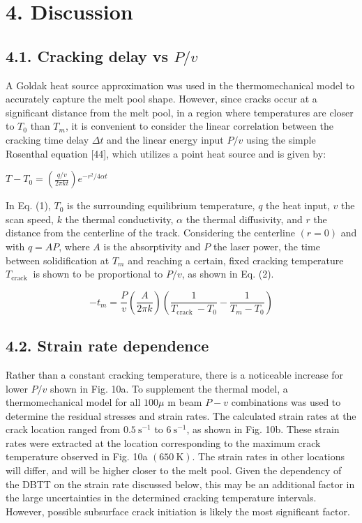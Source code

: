 \documentclass[10pt]{article}
\begin{document}
\section*{4. Discussion}
\subsection*{4.1. Cracking delay vs $P / v$}
A Goldak heat source approximation was used in the thermomechanical model to accurately capture the melt pool shape. However, since cracks occur at a significant distance from the melt pool, in a region where temperatures are closer to $T_{0}$ than $T_{m}$, it is convenient to consider the linear correlation between the cracking time delay $\Delta t$ and the linear energy input $P / v$ using the simple Rosenthal equation [44], which utilizes a point heat source and is given by:

$T-T_{0}=\left(\frac{q / v}{2 \pi k t}\right) e^{-r^{2} / 4 \alpha t}$

In Eq. (1), $T_{0}$ is the surrounding equilibrium temperature, $q$ the heat input, $v$ the scan speed, $k$ the thermal conductivity, $\alpha$ the thermal diffusivity, and $r$ the distance from the centerline of the track. Considering the centerline $(r=0)$ and with $q=A P$, where $A$ is the absorptivity and $P$ the laser power, the time between solidification at $T_{m}$ and reaching a certain, fixed cracking temperature $T_{\text {crack }}$ is shown to be proportional to $P / v$, as shown in Eq. (2).


\begin{equation*}
-t_{m}=\frac{P}{v}\left(\frac{A}{2 \pi k}\right)\left(\frac{1}{T_{\text {crack }}-T_{0}}-\frac{1}{T_{m}-T_{0}}\right) \tag{2}
\end{equation*}


\subsection*{4.2. Strain rate dependence}
Rather than a constant cracking temperature, there is a noticeable increase for lower $P / v$ shown in Fig. 10a. To supplement the thermal model, a thermomechanical model for all $100 \mu$ m beam $P-v$ combinations was used to determine the residual stresses and strain rates. The calculated strain rates at the crack location ranged from $0.5 \mathrm{~s}^{-1}$ to $6 \mathrm{~s}^{-1}$, as shown in Fig. 10b. These strain rates were extracted at the location corresponding to the maximum crack temperature observed in Fig. 10a $(650 \mathrm{~K})$. The strain rates in other locations will differ, and will be higher closer to the melt pool. Given the dependency of the DBTT on the strain rate discussed below, this may be an additional factor in the large uncertainties in the determined cracking temperature intervals. However, possible subsurface crack initiation is likely the most significant factor.
\end{document}
